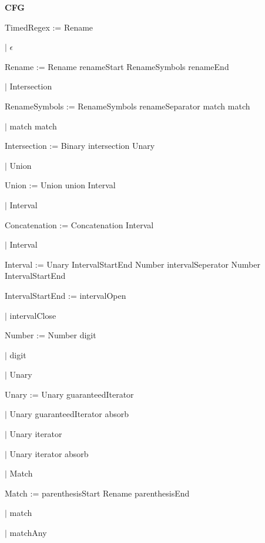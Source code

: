 
\textbf{CFG}

TimedRegex := Rename

\qquad	$\mid$ $\epsilon$

Rename := Rename renameStart RenameSymbols renameEnd

\qquad $\mid$ Intersection

RenameSymbols := RenameSymbols renameSeparator match match

\qquad $\mid$ match match

Intersection := Binary intersection Unary

\qquad $\mid$ Union

Union := Union union Interval

\qquad $\mid$ Interval

Concatenation := Concatenation Interval

\qquad $\mid$ Interval

Interval := Unary IntervalStartEnd Number intervalSeperator Number IntervalStartEnd

IntervalStartEnd := intervalOpen

\qquad $\mid$ intervalClose

Number := Number digit

\qquad $\mid$ digit

\qquad $\mid$ Unary

Unary := Unary guaranteedIterator

\qquad $\mid$ Unary guaranteedIterator absorb

\qquad $\mid$ Unary iterator

\qquad $\mid$ Unary iterator absorb

\qquad $\mid$ Match

Match := parenthesisStart Rename parenthesisEnd

\qquad $\mid$ match

\qquad $\mid$ matchAny

